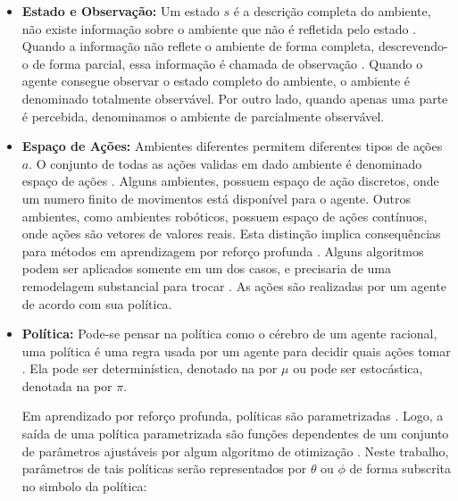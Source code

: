 \begin{itemize}
    \item \textbf{Estado e Observação:} Um estado $s$ é a descrição completa do ambiente, não existe informação sobre o ambiente que não é refletida pelo estado \cite{rl_intro}. Quando a informação não reflete o ambiente de forma completa, descrevendo-o de forma parcial, essa informação é chamada de observação \cite{machinelearning}. Quando o agente consegue observar o estado completo do ambiente, o ambiente é denominado totalmente observável. Por outro lado, quando apenas uma parte é percebida, denominamos o ambiente de parcialmente observável.
    
    \item \textbf{Espaço de Ações:} Ambientes diferentes permitem diferentes tipos de ações $a$. O conjunto de todas as ações validas em dado ambiente é denominado espaço de ações \cite{rl_intro}. Alguns ambientes, possuem espaço de ação discretos, onde um numero finito de movimentos está disponível para o agente. Outros ambientes, como ambientes robóticos, possuem espaço de ações contínuos, onde ações são vetores de valores reais. Esta distinção implica consequências para métodos em aprendizagem por reforço profunda \cite{SpinningUp2018}. Alguns algoritmos podem ser aplicados somente em um dos casos, e precisaria de uma remodelagem substancial para trocar \cite{SpinningUp2018}. As ações são realizadas por um agente de acordo com sua política.

    \item \textbf{Política:} Pode-se pensar na política como o cérebro de um agente racional, uma política é uma regra usada por um agente para decidir quais ações tomar \cite{machinelearning}. Ela pode ser determinística, denotado na  por $\mu$ ou pode ser estocástica, denotada na  por $\pi$.


    Em aprendizado por reforço profunda, políticas são parametrizadas \cite{deeprl}. Logo, a saída de uma política parametrizada são funções dependentes de um conjunto de parâmetros ajustáveis por algum algoritmo de otimização \cite{deeprl}. Neste trabalho, parâmetros de tais políticas serão representados por $\theta$ ou $\phi$ de forma subscrita no simbolo da política:

    

\end{itemize}
